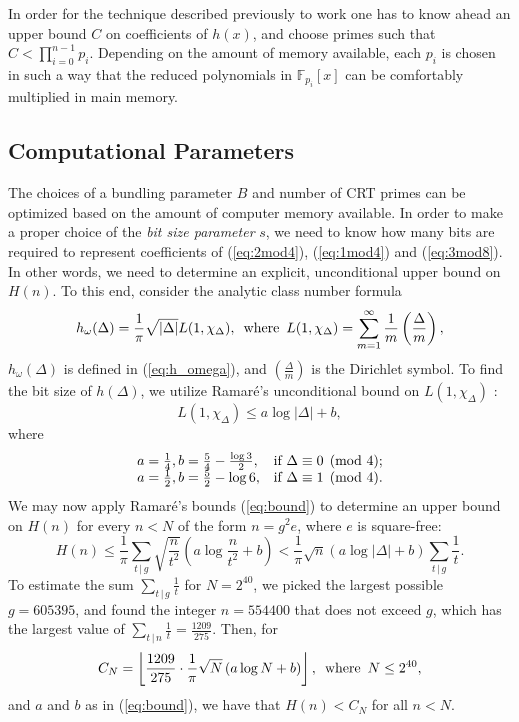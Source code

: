 \documentclass{mcom-l}
\theoremstyle{definition}
\begin{document}
In order for the technique described previously to work one has to
know ahead an upper bound $C$ on coefficients of $h(x)$, and choose
primes such that $C < \prod_{i = 0}^{n-1}p_i$.
Depending on the amount of memory available, each $p_i$ is chosen in
such a way that the reduced polynomials in $\mathbb{F}_{p_i}[x]$ can
be comfortably multiplied in main memory.

\subsection{Computational Parameters} \label{subsec:parameters}

The choices of a bundling parameter $B$ and number of CRT primes can
be optimized based on the amount of computer memory available. In
order to make a proper choice of the \emph{bit size parameter} $s$, we
need to know how many bits are required to represent coefficients of
(\ref{eq:2mod4}), (\ref{eq:1mod4}) and (\ref{eq:3mod8}). In other
words, we need to determine an explicit, unconditional upper bound on
$H(n)$. To this end, consider the analytic class number formula
$$
h_\omega(\Delta) = \frac{1}{\pi}\sqrt{|\Delta|}L(1,\chi_\Delta), \,\,\, \textnormal{where} \,\,\, L(1,\chi_\Delta) = \sum_{m = 1}^\infty \frac{1}{m}\left(\frac{\Delta}{m}\right),
$$
$h_\omega(\Delta)$ is defined in (\ref{eq:h_omega}), and $\left(\frac{\Delta}{m}\right)$ is the Dirichlet symbol. To find the bit size of $h(\Delta)$, we utilize Ramar\'e's unconditional bound on $L(1, \chi_\Delta)$ \cite{ramare}:
\begin{equation} \label{eq:bound}
L(1,\chi_\Delta) \leq a \log |\Delta| + b,
\end{equation}
where
$$
\begin{array}{l l}
a = \frac{1}{4}, b = \frac{5}{4} - \frac{\log 3}{2}, & \textnormal{if
  $\Delta \equiv 0 \pmod{4}$};\\
a = \frac{1}{2}, b = \frac{5}{2} - \log{6}, & \textnormal{if $\Delta
  \equiv 1 \pmod{4}$}.
\end{array}
$$
We may now apply Ramar\'e's bounds (\ref{eq:bound}) to determine an
upper bound on $H(n)$ for every $n < N$ of the form $n = g^2e$, where $e$ is square-free:
$$
H(n) \leq \frac{1}{\pi}\sum_{t\,|\,g}\sqrt{\frac{n}{t^2}}\left(a\log\frac{n}{t^2} + b\right) < \frac{1}{\pi}\sqrt{n}(a\log|\Delta| + b)\sum_{t\,|\,g}\frac{1}{t}.
$$
To estimate the sum $\sum_{t\,|\,g}\frac{1}{t}$ for $N = 2^{40}$, we
picked the largest possible $g = 605395$, and found the integer $n =
554400$ that does not exceed $g$, which has the largest value of
$\sum_{t\,|\,n}\frac{1}{t} = \frac{1209}{275}$.  Then, for
\begin{equation} \label{eq:CN}
C_N = \left\lfloor \frac{1209}{275}\cdot \frac{1}{\pi}\sqrt{N}\left(a\log N + b\right) \right\rfloor, \,\,\, \textnormal{where}\,\,\, N \leq 2^{40},
\end{equation}
and $a$ and $b$ as in (\ref{eq:bound}), we have that $H(n) < C_N$ for all $n < N$.
\end{document}
